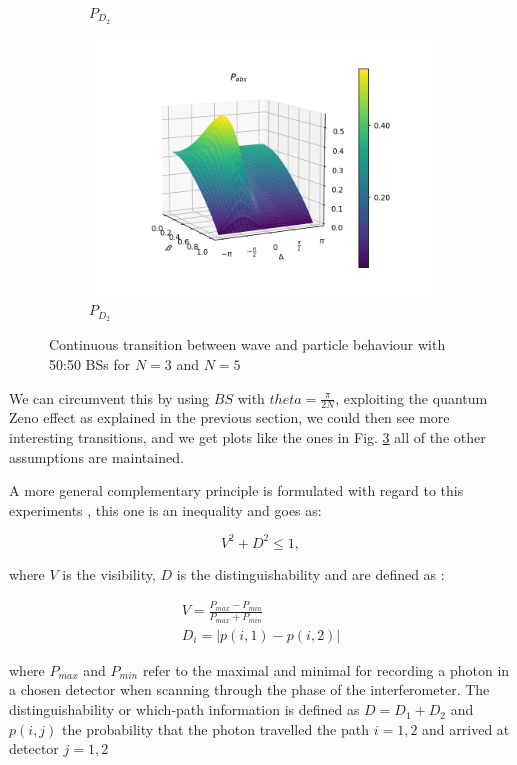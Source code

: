 \documentclass{book}
\begin{document}
\begin{figure}[H]
\begin{subfigure}[b]{0.30\linewidth}
\caption{$P_{D_{2}}$ }
\label{fig:BS1}
\end{subfigure}
\begin{subfigure}[b]{0.30\linewidth}
\includegraphics[width=\linewidth]{images/pabs_5.png}
\caption{$P_{D_{2}}$ }
\label{fig:BS1}
\end{subfigure}
\caption{Continuous transition between wave and particle behaviour with 50:50 BSs for $N=3$ and $N=5$}
\label{varias2}
\end{figure}

We can circumvent this by using $BS$ with $theta=\frac{\pi}{2N}$, exploiting the quantum Zeno effect as explained in the previous section, we could then see more interesting transitions, and we get plots like the ones in Fig. \ref{varias2} all of the other assumptions are maintained.



A more general complementary principle is formulated with regard to this experiments \cite{Ma}, this one is an inequality and goes as:

\begin{equation}
 V^{2} + D^{2} \leq 1,
\end{equation}

where $V$ is the visibility, $D$ is the distinguishability and are defined as :

\begin{align}
 V= \frac{P_{max}-P_{min}}{P_{max}+P_{min}}\\
 D_{i}=|p(i,1)-p(i,2)|
\end{align}

where $P_{max}$ and $P_{min}$ refer to the maximal and minimal for recording a photon in a chosen detector when scanning through the phase of the interferometer. The distinguishability or which-path information is defined as $D=D_{1}+D_{2}$ and $p(i,j)$ the probability that the photon travelled the path $i=1,2$ and arrived at detector $j=1,2$
\end{document}
